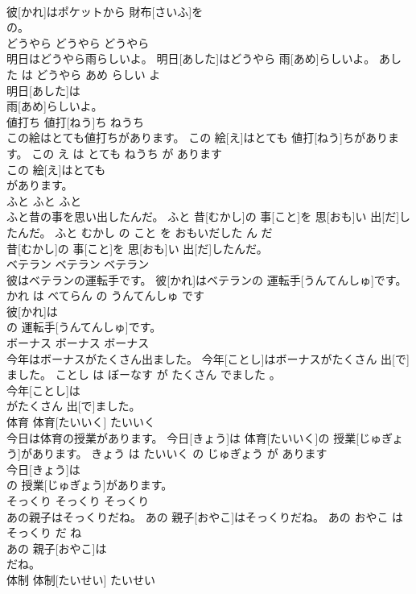 \documentclass[8pt]{extreport}
\begin{document}
\begin{CJK}{UTF8}{min}
\\	彼[かれ]はポケットから 財布[さいふ]を
\\	の。			
\\	どうやら	どうやら	どうやら	
\\	明日はどうやら雨らしいよ。	明日[あした]はどうやら 雨[あめ]らしいよ。	あした は どうやら あめ らしい よ	
\\	明日[あした]は
\\	雨[あめ]らしいよ。			
\\	値打ち	値打[ねう]ち	ねうち	
\\	この絵はとても値打ちがあります。	この 絵[え]はとても 値打[ねう]ちがあります。	この え は とても ねうち が あります	
\\	この 絵[え]はとても
\\	があります。			
\\	ふと	ふと	ふと	
\\	ふと昔の事を思い出したんだ。	ふと 昔[むかし]の 事[こと]を 思[おも]い 出[だ]したんだ。	ふと むかし の こと を おもいだした ん だ	
\\	昔[むかし]の 事[こと]を 思[おも]い 出[だ]したんだ。			
\\	ベテラン	ベテラン	ベテラン	
\\	彼はベテランの運転手です。	彼[かれ]はベテランの 運転手[うんてんしゅ]です。	かれ は べてらん の うんてんしゅ です	
\\	彼[かれ]は
\\	の 運転手[うんてんしゅ]です。			
\\	ボーナス	ボーナス	ボーナス	
\\	今年はボーナスがたくさん出ました。	今年[ことし]はボーナスがたくさん 出[で]ました。	ことし は ぼーなす が たくさん でました 。	
\\	今年[ことし]は
\\	がたくさん 出[で]ました。			
\\	体育	体育[たいいく]	たいいく	
\\	今日は体育の授業があります。	今日[きょう]は 体育[たいいく]の 授業[じゅぎょう]があります。	きょう は たいいく の じゅぎょう が あります	
\\	今日[きょう]は
\\	の 授業[じゅぎょう]があります。			
\\	そっくり	そっくり	そっくり	
\\	あの親子はそっくりだね。	あの 親子[おやこ]はそっくりだね。	あの おやこ は そっくり だ ね	
\\	あの 親子[おやこ]は
\\	だね。			
\\	体制	体制[たいせい]	たいせい	

\end{CJK}
\end{document}
